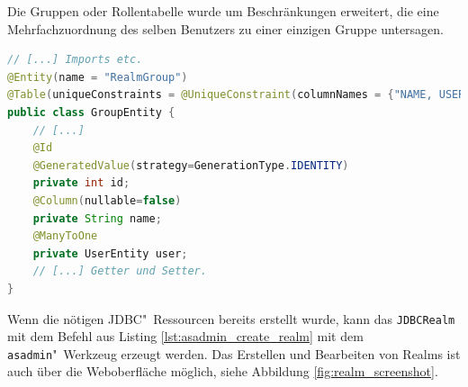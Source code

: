 Die Gruppen oder Rollentabelle wurde um Beschränkungen erweitert, die eine Mehrfachzuordnung des selben Benutzers zu einer einzigen Gruppe untersagen.
\begin{lstlisting}[language=Java,caption={Auszug aus der GroupEntity Klasse.}, label=lst:jdbcrealm_klasse_gruppe_code]
// [...] Imports etc.
@Entity(name = "RealmGroup")
@Table(uniqueConstraints = @UniqueConstraint(columnNames = {"NAME, USER_ID"}))
public class GroupEntity {
    // [...]
    @Id
    @GeneratedValue(strategy=GenerationType.IDENTITY)
    private int id;
    @Column(nullable=false)
    private String name;
    @ManyToOne
    private UserEntity user;
    // [...] Getter und Setter.
}
\end{lstlisting}

Wenn die nötigen \ac{JDBC}"~Ressourcen bereits erstellt wurde, kann das \texttt{JDBCRealm} mit dem Befehl aus Listing \ref{lst:asadmin_create_realm} mit dem \texttt{asadmin}"~Werkzeug erzeugt werden.
Das Erstellen und Bearbeiten von Realms ist auch über die Weboberfläche möglich, siehe Abbildung \ref{fig:realm_screenshot}.


